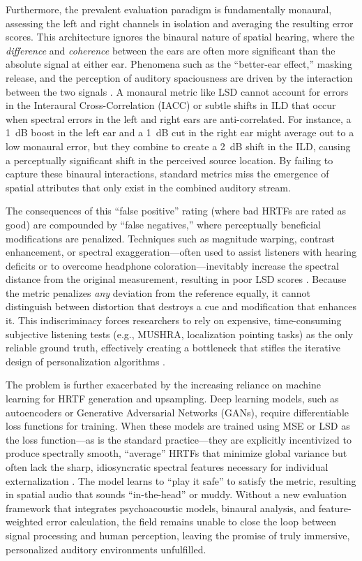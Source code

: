 \documentclass[12pt,a4paper]{article}
\begin{document}
Furthermore, the prevalent evaluation paradigm is fundamentally monaural, assessing the left and right channels in isolation and averaging the resulting error scores. This architecture ignores the binaural nature of spatial hearing, where the \textit{difference} and \textit{coherence} between the ears are often more significant than the absolute signal at either ear. Phenomena such as the ``better-ear effect,'' masking release, and the perception of auditory spaciousness are driven by the interaction between the two signals \cite{andreopoulou_icmc2014}. A monaural metric like LSD cannot account for errors in the Interaural Cross-Correlation (IACC) or subtle shifts in ILD that occur when spectral errors in the left and right ears are anti-correlated. For instance, a 1~dB boost in the left ear and a 1~dB cut in the right ear might average out to a low monaural error, but they combine to create a 2~dB shift in the ILD, causing a perceptually significant shift in the perceived source location. By failing to capture these binaural interactions, standard metrics miss the emergence of spatial attributes that only exist in the combined auditory stream.

The consequences of this ``false positive'' rating (where bad HRTFs are rated as good) are compounded by ``false negatives,'' where perceptually beneficial modifications are penalized. Techniques such as magnitude warping, contrast enhancement, or spectral exaggeration---often used to assist listeners with hearing deficits or to overcome headphone coloration---inevitably increase the spectral distance from the original measurement, resulting in poor LSD scores \cite{audloc2024}. Because the metric penalizes \textit{any} deviation from the reference equally, it cannot distinguish between distortion that destroys a cue and modification that enhances it. This indiscriminacy forces researchers to rely on expensive, time-consuming subjective listening tests (e.g., MUSHRA, localization pointing tasks) as the only reliable ground truth, effectively creating a bottleneck that stifles the iterative design of personalization algorithms \cite{zhang2025}.

The problem is further exacerbated by the increasing reliance on machine learning for HRTF generation and upsampling. Deep learning models, such as autoencoders or Generative Adversarial Networks (GANs), require differentiable loss functions for training. When these models are trained using MSE or LSD as the loss function---as is the standard practice---they are explicitly incentivized to produce spectrally smooth, ``average'' HRTFs that minimize global variance but often lack the sharp, idiosyncratic spectral features necessary for individual externalization \cite{itd_loss2024}. The model learns to ``play it safe'' to satisfy the metric, resulting in spatial audio that sounds ``in-the-head'' or muddy. Without a new evaluation framework that integrates psychoacoustic models, binaural analysis, and feature-weighted error calculation, the field remains unable to close the loop between signal processing and human perception, leaving the promise of truly immersive, personalized auditory environments unfulfilled.
\end{document}
